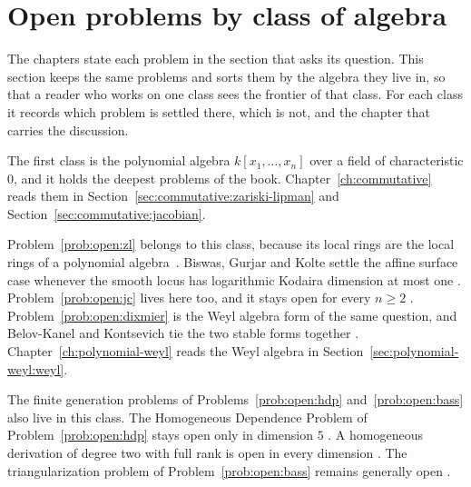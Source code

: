 \section{Open problems by class of algebra}\label{sec:basic-theory:open-problems-by-class}

The chapters state each problem in the section that asks its question. This
section keeps the same problems and sorts them by the algebra they live in, so
that a reader who works on one class sees the frontier of that class. For each
class it records which problem is settled there, which is not, and the chapter
that carries the discussion.

The first class is the polynomial algebra $k[x_1,\dots,x_n]$ over a field of
characteristic $0$, and it holds the deepest problems of the book.
Chapter~\ref{ch:commutative} reads them in
Section~\ref{sec:commutative:zariski-lipman} and
Section~\ref{sec:commutative:jacobian}.

Problem~\ref{prob:open:zl} belongs to this class, because its local rings are
the local rings of a polynomial algebra~\cite[Theorem~1, p.~2]{BelovKanelKontsevich2007}.
Biswas, Gurjar and Kolte settle the affine surface case whenever the smooth
locus has logarithmic Kodaira dimension at most one
\cite[Theorem~1.2, p.~271]{BiswasGurjarKolte2014}.
Problem~\ref{prob:open:jc} lives here too, and it stays open for every $n\ge2$
\cite[pp.~1--2]{BelovKanelKontsevich2007}.
Problem~\ref{prob:open:dixmier} is the Weyl algebra form of the same question,
and Belov-Kanel and Kontsevich tie the two stable forms together
\cite[Theorem~1, p.~2]{BelovKanelKontsevich2007}.
Chapter~\ref{ch:polynomial-weyl} reads the Weyl algebra in
Section~\ref{sec:polynomial-weyl:weyl}.

The finite generation problems of Problems~\ref{prob:open:hdp}
and~\ref{prob:open:bass} also live in this class. The Homogeneous Dependence
Problem of Problem~\ref{prob:open:hdp} stays open only in dimension $5$
\cite[p.~108]{Freudenburg2017}. A homogeneous derivation of degree two with
full rank is open in every dimension \cite[Remark~3.51,
p.~112]{Freudenburg2017}. The triangularization problem of
Problem~\ref{prob:open:bass} remains generally open
\cite[p.~288]{Freudenburg2017}.

